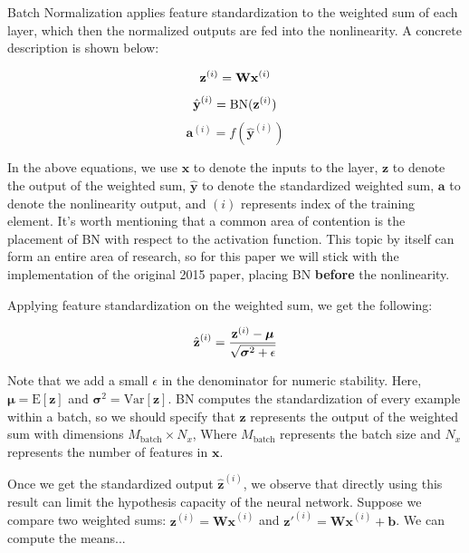 \documentclass{article}
\begin{document}
\begin{multicols}{2}
Batch Normalization applies feature standardization to the weighted sum of 
each layer, which then the normalized outputs are fed into the nonlinearity.
A concrete description is shown below:

\begin{equation}
    \textbf{z}^{(i)} = \textbf{W}\textbf{x}^{(i)} \notag
\end{equation}
\begin{equation}
    \hat{\textbf{y}}^{(i)} = \text{BN}(\textbf{z}^{(i)}) \notag
\end{equation}
\begin{equation}
    \textbf{a}^{(i)} = f(\hat{\textbf{y}}^{(i)}) 
\end{equation}

In the above equations, we use $\textbf{x}$ to denote the inputs to the layer, 
$\textbf{z}$ to denote the output of the weighted sum, 
$\hat{\textbf{y}}$ to denote the standardized weighted sum,
$\textbf{a}$ to denote the nonlinearity output, and $(i)$ represents index 
of the training element.
It's worth mentioning that a common area of contention is the placement 
of BN with respect to the activation function. This topic by itself 
can form an entire area of research, so for this paper we will stick with the 
implementation of the original 2015 paper, placing BN \textbf{before} the nonlinearity.

Applying feature standardization on the weighted sum, we get the following:

\begin{equation}
    \hat{\textbf{z}}^{(i)} = {\textbf{z}^{(i)} - \boldsymbol{\mu}\over \sqrt{\boldsymbol{\sigma}^2 + \epsilon}} 
\end{equation}

Note that we add a small $\epsilon$ in the denominator for numeric stability.
Here, $\boldsymbol{\mu} = \text{E}[\textbf{z}]$ and 
$\boldsymbol{\sigma}^2 = \text{Var}[\textbf{z}]$. BN computes the standardization
of every example within a batch, so we should specify that $\textbf{z}$
represents the output of the weighted sum with dimensions $M_{\text{batch}} \times N_x$,
Where $M_{\text{batch}}$ represents the batch size and $N_x$ represents the 
number of features in $\textbf{x}$.

Once we get the standardized output 
$\hat{\textbf{z}}^{(i)}$, we observe that directly using this result can limit 
the hypothesis capacity of the neural network. Suppose we compare two
weighted sums: $\textbf{z}^{(i)} = \textbf{Wx}^{(i)}$ and $\textbf{z}'^{(i)} = \textbf{Wx}^{(i)} + \textbf{b}$.
We can compute the means...


\end{multicols}
\end{document}
